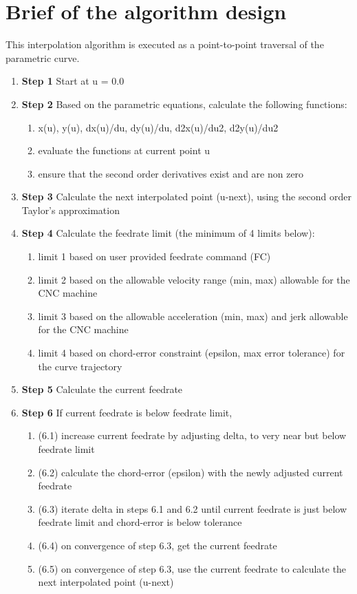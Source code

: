 \pagebreak
\section{Brief of the algorithm design}

This interpolation algorithm is executed as a point-to-point traversal of the parametric curve. 

\begin{enumerate}
	\item \textbf{Step 1} Start at u = 0.0 
	
	\item \textbf{Step 2} Based on the parametric equations, calculate the following functions:
	
	\begin{enumerate}
	    \item x(u), y(u), dx(u)/du, dy(u)/du, d2x(u)/du2, d2y(u)/du2
	    \item evaluate the functions at current point u
	    \item ensure that the second order derivatives exist and are non zero
	\end{enumerate}
		
	\item \textbf{Step 3} Calculate the next interpolated point (u-next), using the second order Taylor's approximation
	 
	\item \textbf{Step 4} Calculate the feedrate limit (the minimum of 4 limits below):
	\begin{enumerate}
		\item limit 1 based on user provided feedrate command (FC)
		\item limit 2 based on the allowable velocity range (min, max) allowable for the CNC machine
		\item limit 3 based on the allowable acceleration (min, max) and jerk allowable for the CNC machine
		\item limit 4 based on chord-error constraint (epsilon, max error tolerance) for the curve trajectory
	\end{enumerate}
	
	\item \textbf{Step 5} Calculate the current feedrate
	
	\item \textbf{Step 6} If current feedrate is below feedrate limit,
	\begin{enumerate}
		\item  (6.1) increase current feedrate by adjusting delta, to very near but below feedrate limit
		\item  (6.2) calculate the chord-error (epsilon) with the newly adjusted current feedrate
		\item  (6.3) iterate delta in steps 6.1 and 6.2 until current feedrate is just below feedrate limit and chord-error is below tolerance
		\item  (6.4) on convergence of step 6.3, get the current feedrate 
		\item  (6.5) on convergence of step 6.3, use the current feedrate to calculate the next interpolated point (u-next)    
	\end{enumerate}


\end{enumerate}

